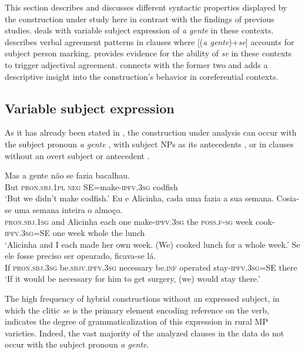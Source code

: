 \documentclass[output=paper]{langscibook}
\begin{document}
This section describes and discusses different syntactic properties displayed by the construction under study here in contrast with the findings of previous studies.  deals with variable subject expression of \textit{a gente} in these contexts.  describes verbal agreement patterns in clauses where [(\textit{a gente})+\textit{se}] accounts for subject person marking.  provides evidence for the ability of \textit{se} in these contexts to trigger adjectival agreement.  connects with the former two and adds a descriptive insight into the construction's behavior in coreferential contexts.

\subsection{\label{bkm:Ref83459778}Variable subject expression}\label{sec:henriques:5.1}


As it has already been stated in , the construction under analysis can occur with the subject pronoun \textit{a gente} , with subject NPs as its antecedents , or in clauses without an overt subject or antecedent .

\ea\label{ex:henriques:24}
 \gll Mas {a gente} não {se fazia} bacalhau.\\
         But \textsc{pron.sbj.1pl} \textsc{neg} SE=make-\textsc{ipfv.3sg} codfish\\
 \glt `But we didn't make codfish.'
\ex\label{ex:henriques:25}
 \gll Eu e Alicinha, cada uma fazia a sua semana. Cosia-se uma semana inteira o almoço.\\
         \textsc{pron.sbj.1sg} and Alicinha each one make-\textsc{ipfv.3sg} the \textsc{poss.f-sg} week cook-\textsc{ipfv.3sg}=SE one week whole the lunch\\
 \glt `Alicinha and I each made her own week. (We) cooked lunch for a whole week.'
\ex\label{ex:henriques:26}
 \gll Se ele fosse preciso ser opearado, ficava-se lá.\\
         If \textsc{pron.sbj.3sg} be.\textsc{sbjv.ipfv.3sg} necessary be.\textsc{inf} operated stay-\textsc{ipfv.3sg}=SE there\\
 \glt `If it would be necessary for him to get surgery, (we) would stay there.'
\z 

The high frequency of hybrid constructions without an expressed subject, in which the clitic \textit{se} is the primary element encoding  reference on the verb, indicates the degree of grammaticalization of this expression in rural MP varieties. Indeed, the vast majority of the analyzed clauses in the data do not occur with the subject pronoun \textit{a gente}.
\end{document}
